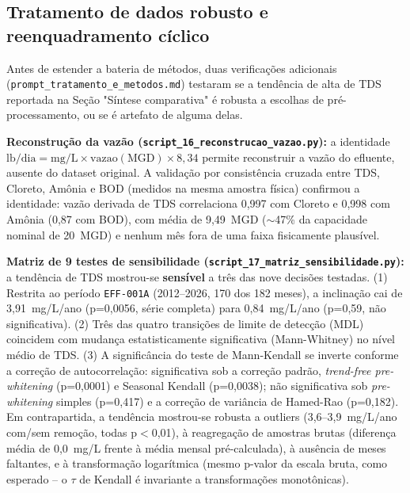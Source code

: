 \subsection{Tratamento de dados robusto e reenquadramento cíclico}

Antes de estender a bateria de métodos, duas verificações adicionais (\texttt{prompt\_tratamento\_e\_metodos.md}) testaram se a tendência de alta de TDS reportada na Seção "Síntese comparativa" é robusta a escolhas de pré-processamento, ou se é artefato de alguma delas.

\textbf{Reconstrução da vazão (\texttt{script\_16\_reconstrucao\_vazao.py}):} a identidade $\mathrm{lb/dia} = \mathrm{mg/L} \times \mathrm{vazao(MGD)} \times 8{,}34$ permite reconstruir a vazão do efluente, ausente do dataset original. A validação por consistência cruzada entre TDS, Cloreto, Amônia e BOD (medidos na mesma amostra física) confirmou a identidade: vazão derivada de TDS correlaciona 0,997 com Cloreto e 0,998 com Amônia (0,87 com BOD), com média de 9,49~MGD ($\sim$47\% da capacidade nominal de 20~MGD) e nenhum mês fora de uma faixa fisicamente plausível.

\textbf{Matriz de 9 testes de sensibilidade (\texttt{script\_17\_matriz\_sensibilidade.py}):} a tendência de TDS mostrou-se \textbf{sensível} a três das nove decisões testadas. (1) Restrita ao período \texttt{EFF-001A} (2012--2026, 170 dos 182 meses), a inclinação cai de 3,91~mg/L/ano (p=0,0056, série completa) para 0,84~mg/L/ano (p=0,59, não significativa). (2) Três das quatro transições de limite de detecção (MDL) coincidem com mudança estatisticamente significativa (Mann-Whitney) no nível médio de TDS. (3) A significância do teste de Mann-Kendall se inverte conforme a correção de autocorrelação: significativa sob a correção padrão, \textit{trend-free pre-whitening} (p=0,0001) e Seasonal Kendall (p=0,0038); não significativa sob \textit{pre-whitening} simples (p=0,417) e a correção de variância de Hamed-Rao (p=0,182). Em contrapartida, a tendência mostrou-se robusta a outliers (3,6--3,9~mg/L/ano com/sem remoção, todas p$<$0,01), à reagregação de amostras brutas (diferença média de 0,0~mg/L frente à média mensal pré-calculada), à ausência de meses faltantes, e à transformação logarítmica (mesmo p-valor da escala bruta, como esperado -- o $\tau$ de Kendall é invariante a transformações monotônicas).

